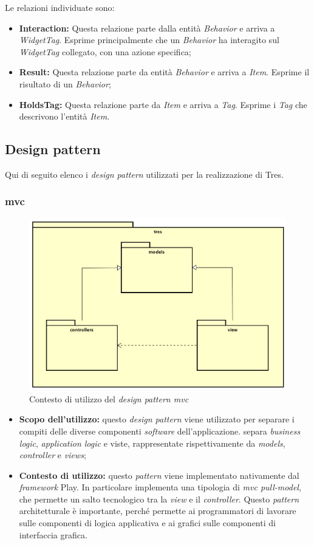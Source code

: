 Le relazioni individuate sono:
\begin{itemize}
\item \textbf{Interaction:} Questa relazione parte dalla entità \emph{Behavior} e arriva a \emph{WidgetTag}. Esprime principalmente che un \emph{Behavior} ha interagito sul \emph{WidgetTag} collegato, con una azione specifica;
\item \textbf{Result:} Questa relazione parte da entità \emph{Behavior} e arriva a \emph{Item}. Esprime il risultato di un \emph{Behavior};
\item \textbf{HoldsTag:} Questa relazione parte da \emph{Item} e arriva a \emph{Tag}. Esprime i \emph{Tag} che descrivono l'entità \emph{Item}.
\end{itemize}
\newpage
\subsection{Design pattern}
Qui di seguito elenco i \emph{design pattern} utilizzati per la realizzazione di Tres.
\subsubsection{\gls{mvc}}
\begin{figure}[h]
\centering
\includegraphics[scale=0.20]{immagini/mvc}
\caption{Contesto di utilizzo del \emph{design pattern \gls{mvc}}}
\label{fig:pattern-mvc}
\end{figure}
\begin{itemize}
\item\textbf{Scopo dell'utilizzo:} questo \emph{design pattern} viene utilizzato per separare i compiti delle diverse componenti \emph{software} dell'applicazione. separa \emph{business logic}, \emph{application logic} e viste, rappresentate rispettivamente da \emph{models}, \emph{controller} e \emph{views};
\item \textbf{Contesto di utilizzo:} questo \emph{pattern} viene implementato nativamente dal \emph{framework} Play. In particolare implementa una tipologia di \emph{\gls{mvc} pull-model}, che permette un salto tecnologico tra la \emph{view} e il \emph{controller}. Questo \emph{pattern} architetturale è importante, perché permette ai programmatori di lavorare sulle componenti di logica applicativa e ai grafici sulle componenti di interfaccia grafica.
\end{itemize}
